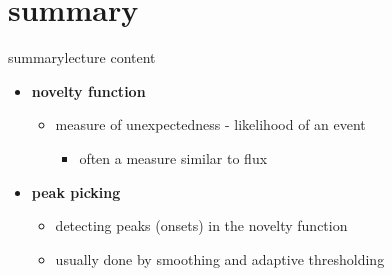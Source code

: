 
    
    \section{summary}
        \begin{frame}{summary}{lecture content}
            \begin{itemize}
                \item   \textbf{novelty function}
                    \begin{itemize}
                        \item   measure of unexpectedness - likelihood of an event
                            \begin{itemize}
                                \item   often a measure similar to flux
                            \end{itemize}
                    \end{itemize}
                \bigskip
                \item   \textbf{peak picking}
                    \begin{itemize}
                        \item   detecting peaks (onsets) in the novelty function
                        \item   usually done by smoothing and adaptive thresholding
                    \end{itemize}
            \end{itemize}
        \end{frame}

